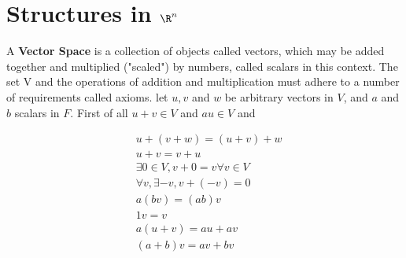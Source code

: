 \documentclass[11pt]{article}
\begin{document}
\section{Structures in $\R^n$}


\begin{defn}
  \label{vector space}
  A \textbf{Vector Space} is a collection of objects called vectors, which may be added together and multiplied ("scaled") by numbers, called scalars in this context. The set V and the operations of addition and multiplication must adhere to a number of requirements called axioms.  let $u, v$ and $w$ be arbitrary vectors in $V$, and $a$ and $b$ scalars in $F$. First of all $u + v \in V$ and $au \in V$ and


  \begin{align}
    	&u + (v + w) = (u + v) + w \\
    	&u + v = v + u \\
      &\exists 0 \in V, v + 0  = v \forall v\in V \\
      &\forall v, \exists -v, v + (-v) = 0 \\
    	&a(bv) = (ab)v \\
      &1v = v \\
      &a(u + v) = au + av \\
      &(a + b)v = av + bv
  \end{align}

\end{defn}
\end{document}
